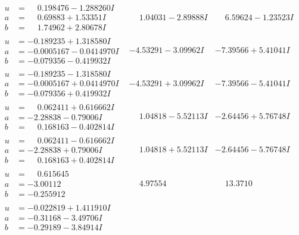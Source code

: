 \documentclass[1p]{elsarticle_modified}
\theoremstyle{definition}
\begin{document}
$$\begin{array}{c|c|c}
\begin{aligned}
u &= \phantom{-}0.198476 - 1.288260 I \\
a &= \phantom{-}0.69883 + 1.53351 I \\
b &= \phantom{-}1.74962 + 2.80678 I\end{aligned}
 & \phantom{-}1.04031 - 2.89888 I & \phantom{-}6.59624 - 1.23523 I \\ \hline\begin{aligned}
u &= -0.189235 + 1.318580 I \\
a &= -0.0005167 - 0.0414970 I \\
b &= -0.079356 - 0.419932 I\end{aligned}
 & -4.53291 - 3.09962 I & -7.39566 + 5.41041 I \\ \hline\begin{aligned}
u &= -0.189235 - 1.318580 I \\
a &= -0.0005167 + 0.0414970 I \\
b &= -0.079356 + 0.419932 I\end{aligned}
 & -4.53291 + 3.09962 I & -7.39566 - 5.41041 I \\ \hline\begin{aligned}
u &= \phantom{-}0.062411 + 0.616662 I \\
a &= -2.28838 - 0.79006 I \\
b &= \phantom{-}0.168163 - 0.402814 I\end{aligned}
 & \phantom{-}1.04818 - 5.52113 I & -2.64456 + 5.76748 I \\ \hline\begin{aligned}
u &= \phantom{-}0.062411 - 0.616662 I \\
a &= -2.28838 + 0.79006 I \\
b &= \phantom{-}0.168163 + 0.402814 I\end{aligned}
 & \phantom{-}1.04818 + 5.52113 I & -2.64456 - 5.76748 I \\ \hline\begin{aligned}
u &= \phantom{-}0.615645\phantom{ +0.000000I} \\
a &= -3.00112\phantom{ +0.000000I} \\
b &= -0.255912\phantom{ +0.000000I}\end{aligned}
 & \phantom{-}4.97554\phantom{ +0.000000I} & \phantom{-}13.3710\phantom{ +0.000000I} \\ \hline\begin{aligned}
u &= -0.022819 + 1.411910 I \\
a &= -0.31168 - 3.49706 I \\
b &= -0.29189 - 3.84914 I\end{aligned}

\end{array}$$
\end{document}
